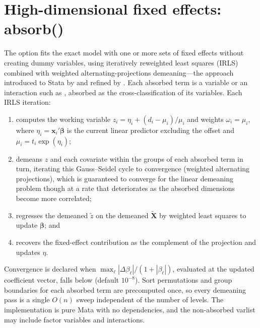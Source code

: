 \documentclass[12pt,a4paper]{article}
\begin{document}
\section{High-dimensional fixed effects: absorb()}

\label{sec:hdfe}

The \stcmd{)} option fits the exact model
with one or more sets of fixed effects without creating dummy variables,
using iteratively reweighted least squares
\citep[sec.~2.5]{mccullagh1989} (IRLS) combined with weighted
alternating-projections demeaning---the approach introduced to Stata by
\citet{guimaraes2010} and refined by \citet{correia2020}. Each absorbed
term is a variable or an interaction such as ,
absorbed as the cross-classification of its variables. Each IRLS
iteration:

\begin{enumerate}
\item computes the working variable $z_i = \eta_i + (d_i - \mu_i)/\mu_i$ and weights $\omega_i = \mu_i$, where $\eta_i = \mathbf{x}_i'\bm{\beta}$ is the current linear predictor excluding the offset and $\mu_i = t_i\exp(\eta_i)$;
\item demeans $z$ and each covariate within the groups of each absorbed term in turn, iterating this Gauss--Seidel cycle to convergence (weighted alternating projections), which is guaranteed to converge for the linear demeaning problem \citep{halperin1962, gaure2013} though at a rate that deteriorates as the absorbed dimensions become more correlated;
\item regresses the demeaned $\tilde{z}$ on the demeaned $\tilde{\mathbf{X}}$ by weighted least squares to update $\bm{\beta}$; and
\item recovers the fixed-effect contribution as the complement of the projection and updates $\eta$.
\end{enumerate}

Convergence is declared when
\(\max_\ell |\Delta\beta_\ell| / (1 + |\beta_\ell|)\), evaluated at the
updated coefficient vector, falls below  (default
\(10^{-8}\)). Sort permutations and group boundaries for each absorbed
term are precomputed once, so every demeaning pass is a single \(O(n)\)
sweep independent of the number of levels. The implementation is pure
Mata with no dependencies, and the non-absorbed varlist may include
factor variables and interactions.
\end{document}
